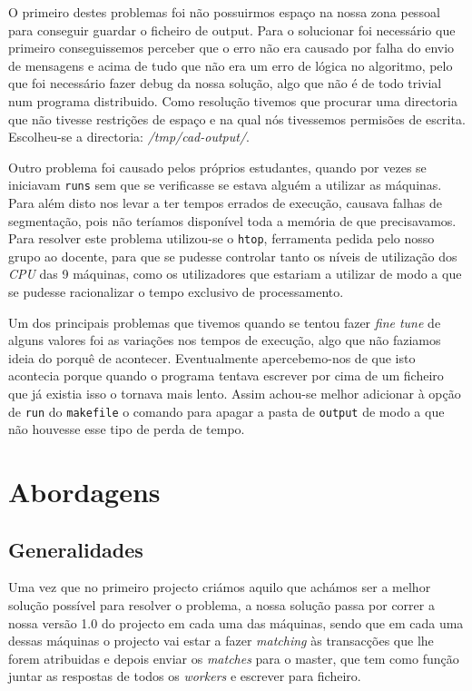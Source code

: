 \documentclass[a4paper]{article}
\begin{document}
O primeiro destes problemas foi não possuirmos espaço na nossa zona pessoal para conseguir guardar o ficheiro de output. Para o solucionar foi necessário que primeiro conseguissemos perceber que o erro não era causado por falha do envio de mensagens e acima de tudo que não era um erro de lógica no algoritmo, pelo que foi necessário fazer debug da nossa solução, algo que não é de todo trivial num programa distribuido. Como resolução tivemos que procurar uma directoria que não tivesse restrições de espaço e na qual nós tivessemos permisões de escrita. Escolheu-se a directoria: \textit{/tmp/cad-output/}.

Outro problema foi causado pelos próprios estudantes, quando por vezes se iniciavam \texttt{runs} sem que se verificasse se estava alguém a utilizar as máquinas. Para além disto nos levar a ter tempos errados de execução, causava falhas de segmentação, pois não teríamos disponível toda a memória de que precisavamos. Para resolver este problema utilizou-se o \texttt{htop}, ferramenta pedida pelo nosso grupo ao docente, para que se pudesse controlar tanto os níveis de utilização dos \textit{CPU} das 9 máquinas, como os utilizadores que estariam a utilizar de modo a que se pudesse racionalizar o tempo exclusivo de processamento.

Um dos principais problemas que tivemos quando se tentou fazer \textit{fine tune} de alguns valores foi as variações nos tempos de execução, algo que não faziamos ideia do porquê de acontecer. Eventualmente apercebemo-nos de que isto acontecia porque quando o programa tentava escrever por cima de um ficheiro que já existia isso o tornava mais lento. Assim achou-se melhor adicionar à opção de \texttt{run} do \texttt{makefile} o comando para apagar a pasta de \texttt{output} de modo a que não houvesse esse tipo de perda de tempo.
\clearpage


\section{Abordagens}
\subsection{Generalidades}
\indent \indent Uma vez que no primeiro projecto criámos aquilo que achámos ser a melhor solução possível para resolver o problema, a nossa solução passa por correr a nossa versão 1.0 do projecto em cada uma das máquinas, sendo que em cada uma dessas máquinas o projecto vai estar a fazer \textit{matching} às transacções que lhe forem atribuidas e depois enviar os \textit{matches} para o master, que tem como função juntar as respostas de todos os \textit{workers} e escrever para ficheiro.
\end{document}
